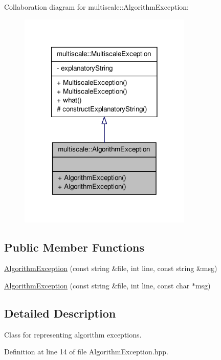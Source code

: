 \-Collaboration diagram for multiscale\-:\-:\-Algorithm\-Exception\-:\nopagebreak
\begin{figure}[H]
\begin{center}
\leavevmode
\includegraphics[width=234pt]{classmultiscale_1_1AlgorithmException__coll__graph}
\end{center}
\end{figure}
\subsection*{\-Public \-Member \-Functions}
\begin{DoxyCompactItemize}
\item 
\hyperlink{classmultiscale_1_1AlgorithmException_a82b64c1819436f13d85f1749c6f0a9a4}{\-Algorithm\-Exception} (const string \&file, int line, const string \&msg)
\item 
\hyperlink{classmultiscale_1_1AlgorithmException_a8e93ad9821b69a6b4ac459f76b3a82ee}{\-Algorithm\-Exception} (const string \&file, int line, const char $\ast$msg)
\end{DoxyCompactItemize}


\subsection{\-Detailed \-Description}
\-Class for representing algorithm exceptions. 

\-Definition at line 14 of file \-Algorithm\-Exception.\-hpp.



